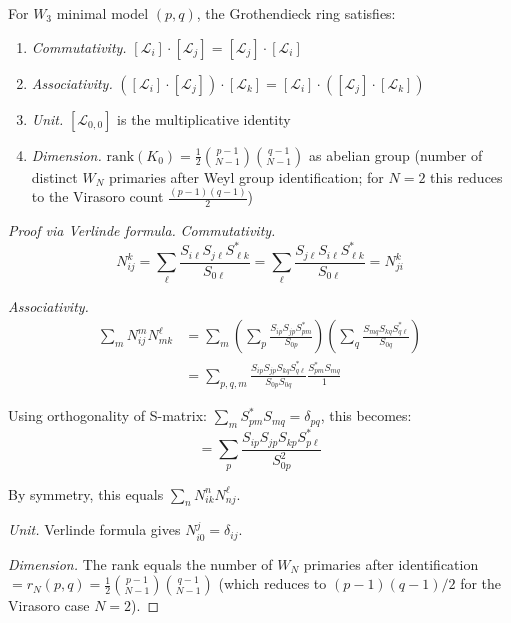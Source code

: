 \begin{theorem}\label{thm:grothendieck-structure}
For $W_3$ minimal model $(p,q)$, the Grothendieck ring satisfies:
\begin{enumerate}
\item \emph{Commutativity.} $[\mathcal{L}_i] \cdot [\mathcal{L}_j] =
[\mathcal{L}_j] \cdot [\mathcal{L}_i]$
\item \emph{Associativity.} $([\mathcal{L}_i] \cdot [\mathcal{L}_j]) \cdot
[\mathcal{L}_k] = [\mathcal{L}_i] \cdot ([\mathcal{L}_j] \cdot [\mathcal{L}_k])$
\item \emph{Unit.} $[\mathcal{L}_{0,0}]$ is the multiplicative identity
\item \emph{Dimension.} $\text{rank}(K_0) = \frac{1}{2}\binom{p-1}{N-1}\binom{q-1}{N-1}$ as abelian group (number of distinct $W_N$ primaries after Weyl group identification; for $N = 2$ this reduces to the Virasoro count $\frac{(p-1)(q-1)}{2}$)
\end{enumerate}
\end{theorem}

\begin{proof}[Proof via Verlinde formula]

\emph{Commutativity.}
\[N_{ij}^k = \sum_\ell \frac{S_{i\ell}S_{j\ell}S_{\ell k}^*}{S_{0\ell}} 
= \sum_\ell \frac{S_{j\ell}S_{i\ell}S_{\ell k}^*}{S_{0\ell}} = N_{ji}^k\]



\emph{Associativity.}
\begin{align}
\sum_m N_{ij}^m N_{mk}^\ell &= \sum_m \left(\sum_p \frac{S_{ip}S_{jp}S_{pm}^*}{S_{0p}}\right)
\left(\sum_q \frac{S_{mq}S_{kq}S_{q\ell}^*}{S_{0q}}\right) \\
&= \sum_{p,q,m} \frac{S_{ip}S_{jp}S_{kq}S_{q\ell}^*}{S_{0p}S_{0q}} 
\frac{S_{pm}^* S_{mq}}{1}
\end{align}

Using orthogonality of S-matrix: $\sum_m S_{pm}^* S_{mq} = \delta_{pq}$, this becomes:
\[= \sum_p \frac{S_{ip}S_{jp}S_{kp}S_{p\ell}^*}{S_{0p}^2}\]

By symmetry, this equals $\sum_n N_{ik}^n N_{nj}^\ell$.

\emph{Unit.} Verlinde formula gives $N_{i0}^j = \delta_{ij}$.

\emph{Dimension.} The rank equals the number of $W_N$ primaries after identification $= r_N(p,q) = \frac{1}{2}\binom{p-1}{N-1}\binom{q-1}{N-1}$ (which reduces to $(p-1)(q-1)/2$ for the Virasoro case $N=2$).
\end{proof}

